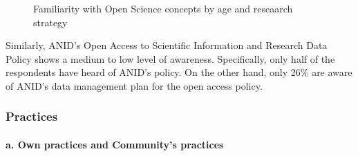 \documentclass[
  letterpaper,
  DIV=11,
  numbers=noendperiod]{scrartcl}
\let\oldparagraph\paragraph
\renewcommand{\paragraph}[1]{\oldparagraph{#1}\mbox{}}
\begin{document}
\begin{figure}
\begin{minipage}[t]{0.50\linewidth}
{\centering 


}

\end{minipage}%

\caption{\label{fig-cca-grid}Familiarity with Open Science concepts by
age and reseaarch strategy}

\end{figure}

Similarly, ANID's Open Access to Scientific Information and Research
Data Policy shows a medium to low level of awareness. Specifically, only
half of the respondents have heard of ANID's policy. On the other hand,
only 26\% are aware of ANID's data management plan for the open access
policy.

\hypertarget{practices}{%
\subsubsection{Practices}\label{practices}}

\hypertarget{a.-own-practices-and-communitys-practices}{%
\paragraph{a. Own practices and Community's
practices}\label{a.-own-practices-and-communitys-practices}}
\end{document}
